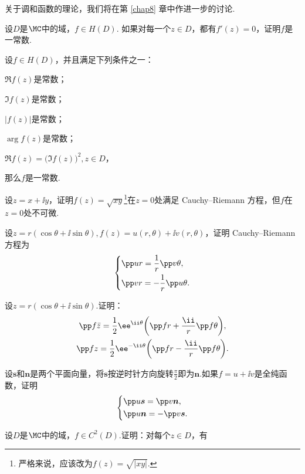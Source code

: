 关于调和函数的理论，我们将在第 \ref{chap8} 章中作进一步的讨论.
\begin{xiti}\hypertarget{xiti2.2}{}
  \item \hypertarget{xiti2.2.1}{}设$D$是$\MC$中的域，$f\in H(D)$. 如果对每一个$z\in D$，都有$f'(z)=0$，证明$f$是一常数.
  \item 设$f\in H(D)$，并且满足下列条件之一：
    \begin{enuma}
      \item $\Re f(z)$是常数；
      \item $\Im f(z)$是常数；
      \item $|f(z)|$是常数；
      \item $\arg f(z)$是常数；
      \item $\Re f(z)=\big(\Im f(z)\big)^2,z\in D$，
    \end{enuma}
    那么$f$是一常数.
  \item 设$z=x+\ii y$，证明$f(z)=\sqrt{xy}$\footnote{严格来说，应该改为$f(z)=\sqrt{|xy|}$.}在$z=0$处满足 Cauchy--Riemann 方程，但$f$在$z=0$处不可微.
  \item \hypertarget{xiti2.2.4}{}设$z=r(\cos\theta+\ii\sin\theta),f(z)=u(r,\theta)+\ii v(r,\theta)$，证明 Cauchy--Riemann 方程为
      \[
        \left\{\begin{aligned}
               & \pp ur = \frac1r \pp v{\theta},\\
               & \pp vr = -\frac1r\pp u{\theta}.
        \end{aligned}\right.
      \]
  \item 设$z=r(\cos\theta+\ii\sin\theta)$.证明：
     \begin{gather*}
       \pp f{\bar z}=\frac12\ee^{\ii\theta}\bigg(\pp fr+\frac{\ii}r\pp f{\theta}\bigg),\\
       \pp fz=\frac12\ee^{-\ii\theta}\bigg(\pp fr-\frac{\ii}r\pp f{\theta}\bigg).
     \end{gather*}
  \item 设$\boldsymbol s$和$\boldsymbol n$是两个平面向量，将$\boldsymbol s$按逆时针方向旋转$\frac\pi2$即为$\boldsymbol n$.如果$f=u+\ii v$是全纯函数，证明
     \[
       \left\{\begin{aligned}
           & \pp u{\boldsymbol s} = \pp v{\boldsymbol n},\\
           & \pp u{\boldsymbol n} = -\pp v{\boldsymbol s}.
            \end{aligned}
       \right.
     \]
  \item 设$D$是$\MC$中的域，$f\in C^2(D)$.证明：对每个$z\in D$，有

\end{xiti}
